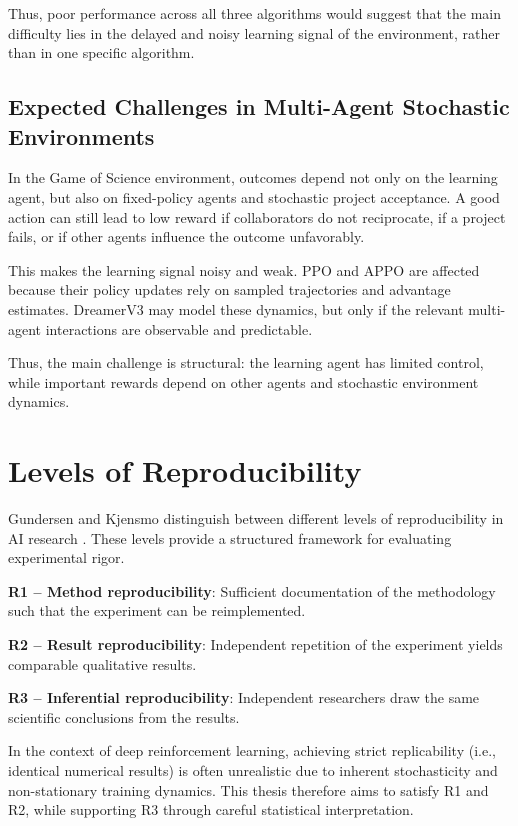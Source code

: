 \documentclass[english,bachelor]{hsluthesis}
\begin{document}
Thus, poor performance across all three algorithms would suggest that the main difficulty lies in the delayed and noisy learning signal of the environment, rather than in one specific algorithm.

\subsection{Expected Challenges in Multi-Agent Stochastic Environments}

In the Game of Science environment, outcomes depend not only on the learning agent, but also on fixed-policy agents and stochastic project acceptance. A good action can still lead to low reward if collaborators do not reciprocate, if a project fails, or if other agents influence the outcome unfavorably.

This makes the learning signal noisy and weak. PPO and APPO are affected because their policy updates rely on sampled trajectories and advantage estimates. DreamerV3 may model these dynamics, but only if the relevant multi-agent interactions are observable and predictable.

Thus, the main challenge is structural: the learning agent has limited control, while important rewards depend on other agents and stochastic environment dynamics.


\section{Levels of Reproducibility}

Gundersen and Kjensmo distinguish between different levels of reproducibility in AI research \cite{Gundersen_Kjensmo_2018}. 
These levels provide a structured framework for evaluating experimental rigor.

\textbf{R1 – Method reproducibility}: 
Sufficient documentation of the methodology such that the experiment can be reimplemented.

\textbf{R2 – Result reproducibility}: 
Independent repetition of the experiment yields comparable qualitative results.

\textbf{R3 – Inferential reproducibility}: 
Independent researchers draw the same scientific conclusions from the results.

In the context of deep reinforcement learning, achieving strict replicability (i.e., identical numerical results) is often unrealistic due to inherent stochasticity and non-stationary training dynamics. 
This thesis therefore aims to satisfy R1 and R2, while supporting R3 through careful statistical interpretation.
\end{document}
